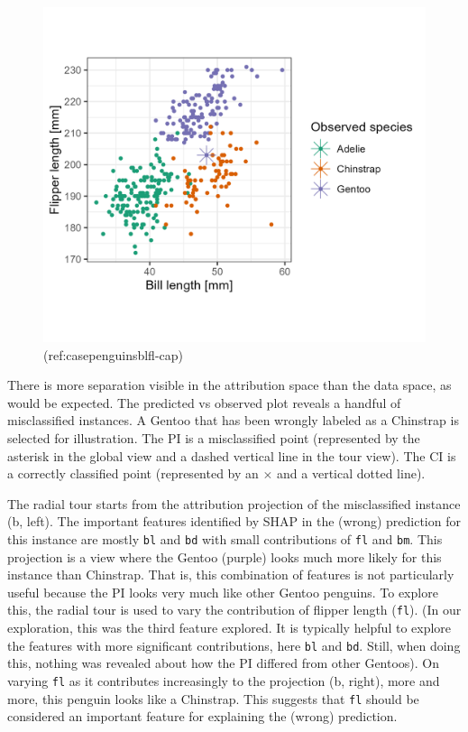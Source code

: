 \documentclass[
]{article}
\begin{document}
\begin{figure}

{\centering \includegraphics[width=1\linewidth]{./figures/case_penguins_BlFl} 

}

\caption{(ref:casepenguinsblfl-cap)}\label{fig:casepenguinsblfl}
\end{figure}

There is more separation visible in the attribution space than the data
space, as would be expected. The predicted vs observed plot reveals a
handful of misclassified instances. A Gentoo that has been wrongly
labeled as a Chinstrap is selected for illustration. The PI is a
misclassified point (represented by the asterisk in the global view and
a dashed vertical line in the tour view). The CI is a correctly
classified point (represented by an \(\times\) and a vertical dotted
line).

The radial tour starts from the attribution projection of the
misclassified instance (b, left). The important features identified by
SHAP in the (wrong) prediction for this instance are mostly \texttt{bl}
and \texttt{bd} with small contributions of \texttt{fl} and \texttt{bm}.
This projection is a view where the Gentoo (purple) looks much more
likely for this instance than Chinstrap. That is, this combination of
features is not particularly useful because the PI looks very much like
other Gentoo penguins. To explore this, the radial tour is used to vary
the contribution of flipper length (\texttt{fl}). (In our exploration,
this was the third feature explored. It is typically helpful to explore
the features with more significant contributions, here \texttt{bl} and
\texttt{bd}. Still, when doing this, nothing was revealed about how the
PI differed from other Gentoos). On varying \texttt{fl} as it
contributes increasingly to the projection (b, right), more and more,
this penguin looks like a Chinstrap. This suggests that \texttt{fl}
should be considered an important feature for explaining the (wrong)
prediction.
\end{document}
